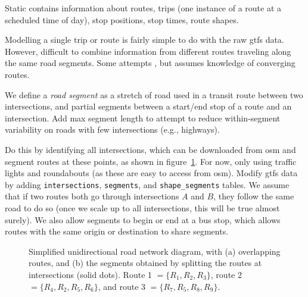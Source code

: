 \documentclass[draftcls,a4paper,onecolumn]{IEEEtran}\usepackage[]{graphicx}\usepackage[]{color}
\newenvironment{knitrout}{}{} %
\begin{document}
Static contains information about routes, 
trips (one instance of a route at a scheduled time of day),
stop positions, stop times, route shapes.

Modelling a single trip or route is fairly simple to do with 
the raw \gls{gtfs} data.
However, difficult to combine information from different routes 
traveling along the same road segments.
Some attempts \cite{Yu_2011}, but assumes knowledge of converging routes.

We define a \emph{road segment} as a stretch of road used 
in a transit route between two intersections,
and partial segments between a start/end stop of a route 
and an intersection.
Add max segment length to attempt to reduce within-segment variability 
on roads with few intersections (e.g., highways).

Do this by identifying all intersections,
which can be downloaded from \gls{osm} \cite{OpenStreetMap_2017}
and segment routes at these points,
as shown in figure~\ref{fig:route_segmentation}.
For now, only using traffic lights and roundabouts 
(as these are easy to access from \gls{osm}).
Modify \gls{gtfs} data
by adding \texttt{intersections}, \texttt{segments}, and \texttt{shape\_segments} tables.
We assume that if two routes both go through intersections $A$ and $B$,
they follow the same road to do so
(once we scale up to all intersections, this will be true almost surely).
We also allow segments to begin or end at a bus stop, 
which allows routes with the same origin or destination to share segments.



\begin{knitrout}
\color{fgcolor}\begin{figure}
\caption[Simplied diagram of overlapping routes]{Simplified unidirectional road network diagram, with (a) overlapping routes, and (b) the segments obtained by splitting the routes at intersections (solid dots). Route 1 $ = \{R_1, R_2, R_3\}$, route 2 $=\{R_4,R_2,R_5,R_6\}$, and route 3 $=\{R_7,R_5,R_8,R_9\}$.}\label{fig:route_segmentation}
\end{figure}


\end{knitrout}
\end{document}
